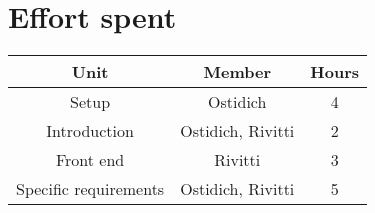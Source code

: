 \chapter{Effort spent}

\begin{table}[h]
    \centering
    \begin{tabular}{|c|c|c|}
        \hline \textbf{Unit} & \textbf{Member} & \textbf{Hours} \\
        \hline Setup & Ostidich & 4 \\
        \hline Introduction & Ostidich, Rivitti & 2 \\
        \hline Front end & Rivitti & 3 \\
        \hline Specific requirements & Ostidich, Rivitti & 5 \\
        \hline
    \end{tabular}\label{tab:effort-table}
\end{table}

